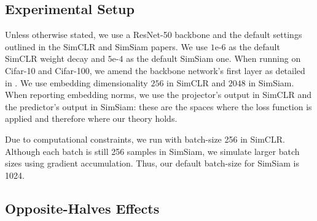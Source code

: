 \subsection{Experimental Setup}
\label{app:experiment_setup}
Unless otherwise stated, we use a ResNet-50 backbone \cite{resnet} and the default settings outlined in the SimCLR \cite{simclr} and SimSiam \cite{simsiam} papers. We use $1$e-$6$ as the default SimCLR weight decay and $5$e-$4$ as the default SimSiam one. When running on Cifar-10 and Cifar-100, we amend the backbone network's first layer as detailed in \citet{simclr}. We use embedding dimensionality $256$ in SimCLR and $2048$ in SimSiam. When reporting embedding norms, we use the projector's output in SimCLR and the predictor's output in SimSiam: these are the spaces where the loss function is applied and therefore where our theory holds.

Due to computational constraints, we run with batch-size 256 in SimCLR. Although each batch is still 256 samples in SimSiam, we simulate larger batch sizes using gradient accumulation. Thus, our default batch-size for SimSiam is 1024. 

\subsection{Opposite-Halves Effects}
\label{app:opposite_halves_effect}

